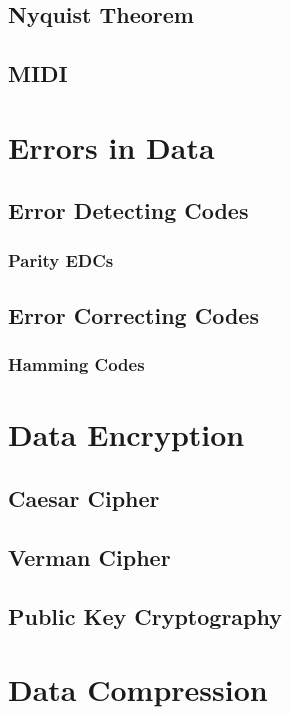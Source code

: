 		\subsection{Nyquist Theorem}
		
		\subsection{MIDI}
	\section{Errors in Data}
		
		\subsection{Error Detecting Codes}
		
			\subsubsection{Parity EDCs}
		
		\subsection{Error Correcting Codes}
		
			\subsubsection{Hamming Codes}
		
	
	
	\section{Data Encryption}
	
		\subsection{Caesar Cipher}
		
		\subsection{Verman Cipher}
		
		\subsection{Public Key Cryptography}
		
	\section{Data Compression}
	
